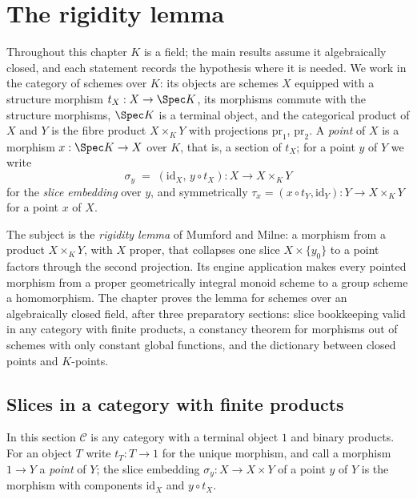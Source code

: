 \chapter{The rigidity lemma}
\label{chap:AbelianVariety}

Throughout this chapter \(K\) is a field; the main results assume it algebraically closed,
and each statement records the hypothesis where it is needed. We work in the category of
schemes over \(K\):
its objects are schemes \(X\) equipped with a structure morphism \(t_X : X \to \Spec K\), its
morphisms commute with the structure morphisms, \(\Spec K\) is a terminal object, and the
categorical product of \(X\) and \(Y\) is the fibre product \(X \times_K Y\) with projections
\(\mathrm{pr}_1\), \(\mathrm{pr}_2\). A \emph{point} of \(X\) is a morphism
\(x : \Spec K \to X\) over \(K\), that is, a section of \(t_X\); for a point \(y\) of \(Y\) we
write
\[
  \sigma_y \;=\; (\mathrm{id}_X,\, y \circ t_X) : X \longrightarrow X \times_K Y
\]
for the \emph{slice embedding} over \(y\), and symmetrically
\(\tau_x = (x \circ t_Y, \mathrm{id}_Y) : Y \to X \times_K Y\) for a point \(x\) of \(X\).

The subject is the \emph{rigidity lemma} of Mumford and Milne: a morphism from a product
\(X \times_K Y\), with \(X\) proper, that collapses one slice \(X \times \{y_0\}\) to a point
factors through the second projection. Its engine application makes every pointed morphism
from a proper geometrically integral monoid scheme to a group scheme a homomorphism. The
chapter proves the lemma for schemes over an algebraically closed field, after three
preparatory sections: slice bookkeeping valid in any category with finite products, a
constancy theorem for morphisms out of schemes with only constant global functions, and the
dictionary between closed points and \(K\)-points.

\section{Slices in a category with finite products}

In this section \(\mathcal C\) is any category with a terminal object \(1\) and binary
products. For an object \(T\) write \(t_T : T \to 1\) for the unique morphism, and call a
morphism \(1 \to Y\) a \emph{point} of \(Y\); the slice embedding \(\sigma_y : X \to X \times Y\)
of a point \(y\) of \(Y\) is the morphism with components \(\mathrm{id}_X\) and
\(y \circ t_X\).

